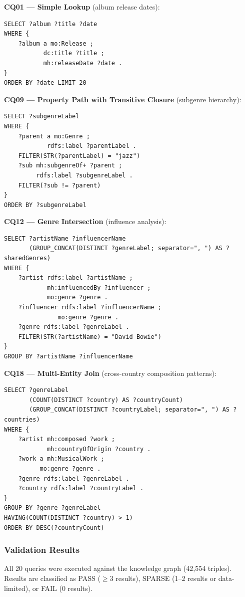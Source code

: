\textbf{CQ01 --- Simple Lookup} (album release dates):
\begin{lstlisting}
SELECT ?album ?title ?date
WHERE {
    ?album a mo:Release ;
           dc:title ?title ;
           mh:releaseDate ?date .
}
ORDER BY ?date LIMIT 20
\end{lstlisting}

\textbf{CQ09 --- Property Path with Transitive Closure} (subgenre hierarchy):
\begin{lstlisting}
SELECT ?subgenreLabel
WHERE {
    ?parent a mo:Genre ;
            rdfs:label ?parentLabel .
    FILTER(STR(?parentLabel) = "jazz")
    ?sub mh:subgenreOf+ ?parent ;
         rdfs:label ?subgenreLabel .
    FILTER(?sub != ?parent)
}
ORDER BY ?subgenreLabel
\end{lstlisting}

\textbf{CQ12 --- Genre Intersection} (influence analysis):
\begin{lstlisting}
SELECT ?artistName ?influencerName
       (GROUP_CONCAT(DISTINCT ?genreLabel; separator=", ") AS ?sharedGenres)
WHERE {
    ?artist rdfs:label ?artistName ;
            mh:influencedBy ?influencer ;
            mo:genre ?genre .
    ?influencer rdfs:label ?influencerName ;
               mo:genre ?genre .
    ?genre rdfs:label ?genreLabel .
    FILTER(STR(?artistName) = "David Bowie")
}
GROUP BY ?artistName ?influencerName
\end{lstlisting}

\textbf{CQ18 --- Multi-Entity Join} (cross-country composition patterns):
\begin{lstlisting}
SELECT ?genreLabel
       (COUNT(DISTINCT ?country) AS ?countryCount)
       (GROUP_CONCAT(DISTINCT ?countryLabel; separator=", ") AS ?countries)
WHERE {
    ?artist mh:composed ?work ;
            mh:countryOfOrigin ?country .
    ?work a mh:MusicalWork ;
          mo:genre ?genre .
    ?genre rdfs:label ?genreLabel .
    ?country rdfs:label ?countryLabel .
}
GROUP BY ?genre ?genreLabel
HAVING(COUNT(DISTINCT ?country) > 1)
ORDER BY DESC(?countryCount)
\end{lstlisting}

\subsubsection{Validation Results}

All 20 queries were executed against the knowledge graph (42,554 triples). Results are classified as PASS ($\geq$3 results), SPARSE (1--2 results or data-limited), or FAIL (0 results).

